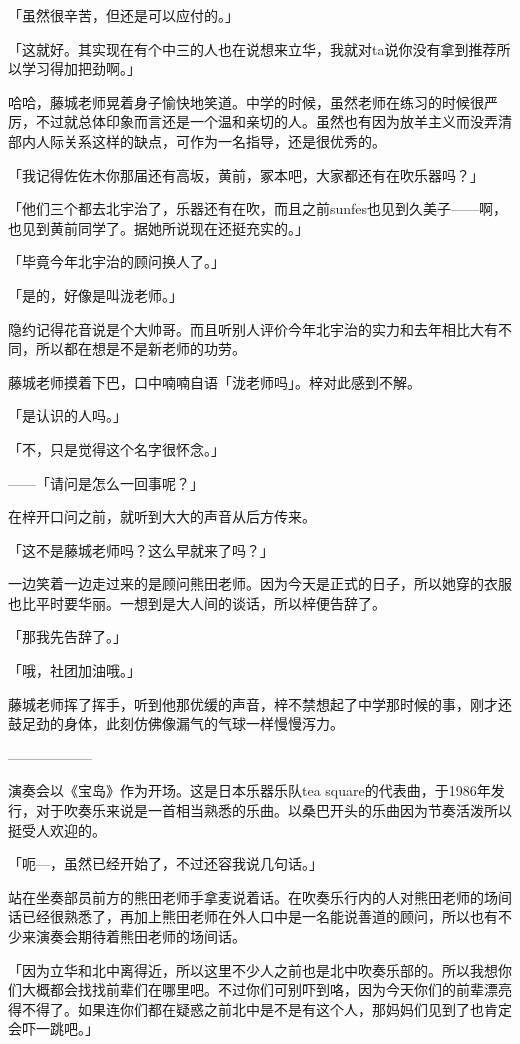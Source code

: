 \documentclass[UTF8]{ctexart}
\begin{document}
    「虽然很辛苦，但还是可以应付的。」

    「这就好。其实现在有个中三的人也在说想来立华，我就对ta说你没有拿到推荐所以学习得加把劲啊。」

    哈哈，藤城老师晃着身子愉快地笑道。中学的时候，虽然老师在练习的时候很严厉，不过就总体印象而言还是一个温和亲切的人。虽然也有因为放羊主义而没弄清部内人际关系这样的缺点，可作为一名指导，还是很优秀的。

    「我记得佐佐木你那届还有高坂，黄前，冢本吧，大家都还有在吹乐器吗？」

    「他们三个都去北宇治了，乐器还有在吹，而且之前sunfes也见到久美子——啊，也见到黄前同学了。据她所说现在还挺充实的。」

    「毕竟今年北宇治的顾问换人了。」

    「是的，好像是叫泷老师。」

    隐约记得花音说是个大帅哥。而且听别人评价今年北宇治的实力和去年相比大有不同，所以都在想是不是新老师的功劳。

    藤城老师摸着下巴，口中喃喃自语「泷老师吗」。梓对此感到不解。

    「是认识的人吗。」

    「不，只是觉得这个名字很怀念。」

    ——「请问是怎么一回事呢？」

    在梓开口问之前，就听到大大的声音从后方传来。

    「这不是藤城老师吗？这么早就来了吗？」

    一边笑着一边走过来的是顾问熊田老师。因为今天是正式的日子，所以她穿的衣服也比平时要华丽。一想到是大人间的谈话，所以梓便告辞了。

    「那我先告辞了。」

    「哦，社团加油哦。」

    藤城老师挥了挥手，听到他那优缓的声音，梓不禁想起了中学那时候的事，刚才还鼓足劲的身体，此刻仿佛像漏气的气球一样慢慢泻力。

    ——————

    演奏会以《宝岛》作为开场。这是日本乐器乐队tea square的代表曲，于1986年发行，对于吹奏乐来说是一首相当熟悉的乐曲。以桑巴开头的乐曲因为节奏活泼所以挺受人欢迎的。

    「呃—，虽然已经开始了，不过还容我说几句话。」

    站在坐奏部员前方的熊田老师手拿麦说着话。在吹奏乐行内的人对熊田老师的场间话已经很熟悉了，再加上熊田老师在外人口中是一名能说善道的顾问，所以也有不少来演奏会期待着熊田老师的场间话。

    「因为立华和北中离得近，所以这里不少人之前也是北中吹奏乐部的。所以我想你们大概都会找找前辈们在哪里吧。不过你们可别吓到咯，因为今天你们的前辈漂亮得不得了。如果连你们都在疑惑之前北中是不是有这个人，那妈妈们见到了也肯定会吓一跳吧。」
\end{document}
